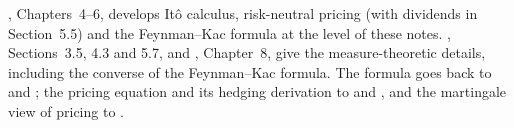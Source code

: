 
\furtherreading
\textcite{shreve2}, Chapters~4--6, develops It\^o calculus, risk-neutral pricing (with dividends
in Section~5.5) and the Feynman--Kac formula at the level of these notes. \textcite{karatzas-shreve},
Sections~3.5, 4.3 and 5.7, and \textcite{oksendal}, Chapter~8, give the measure-theoretic details,
including the converse of the Feynman--Kac formula. The formula goes back to
\textcite{feynman-spacetime} and \textcite{kac-wiener}; the pricing equation and its hedging
derivation to \textcite{black-scholes} and \textcite{merton1973}, and the martingale view of
pricing to \textcite{harrison-pliska}.
